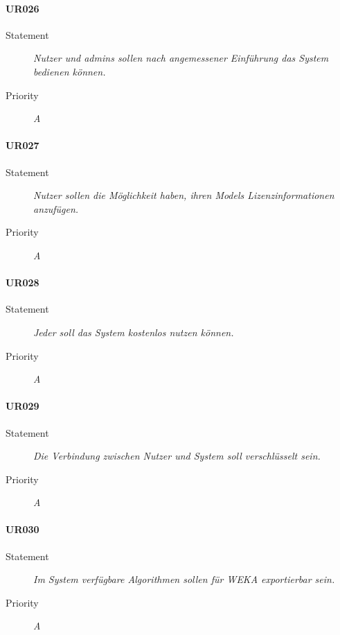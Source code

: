 \paragraph{UR026}
\begin{description}
\item[Statement] \textit{Nutzer und \glspl{admin} sollen nach angemessener Einführung das System bedienen können.}
\item[Priority] \textit{A}
\end{description}

\paragraph{UR027}
\begin{description}
\item[Statement] \textit{Nutzer sollen die Möglichkeit haben, ihren \glspl{Model} Lizenzinformationen anzufügen.}
  \item[Priority]
    \textit{A}
\end{description}

\paragraph{UR028}
\begin{description}
\item[Statement] \textit{Jeder soll das System kostenlos nutzen können.}
\item[Priority] \textit{A}
\end{description}

\paragraph{UR029}
\begin{description}
\item[Statement] \textit{Die Verbindung zwischen Nutzer und System soll verschlüsselt sein.}
\item[Priority] \textit{A}
\end{description}

\paragraph{UR030}
\begin{description}
\item[Statement] \textit{Im System verfügbare Algorithmen sollen für WEKA exportierbar sein.}
\item[Priority] \textit{A}
\end{description}

